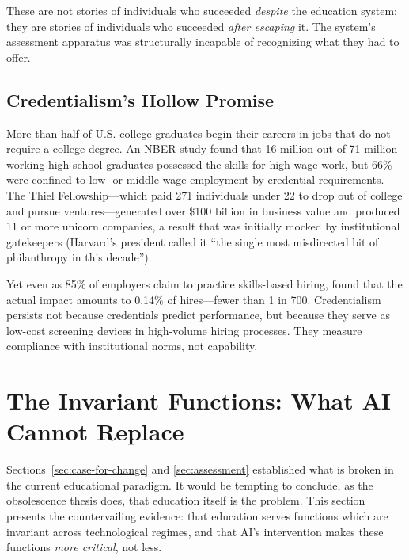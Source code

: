 \documentclass[12pt]{article}
\begin{document}
These are not stories of individuals who succeeded \emph{despite} the education system; they are stories of individuals who succeeded \emph{after escaping} it. The system's assessment apparatus was structurally incapable of recognizing what they had to offer.

\subsection{Credentialism's Hollow Promise}
\label{sec:credentialism}

More than half of U.S. college graduates begin their careers in jobs that do not require a college degree. An NBER study found that 16 million out of 71 million working high school graduates possessed the skills for high-wage work, but 66\% were confined to low- or middle-wage employment by credential requirements. The Thiel Fellowship---which paid 271 individuals under 22 to drop out of college and pursue ventures---generated over \$100 billion in business value and produced 11 or more unicorn companies, a result that was initially mocked by institutional gatekeepers (Harvard's president called it ``the single most misdirected bit of philanthropy in this decade'').

Yet even as 85\% of employers claim to practice skills-based hiring, \citet{HBS2024skills} found that the actual impact amounts to 0.14\% of hires---fewer than 1 in 700. Credentialism persists not because credentials predict performance, but because they serve as low-cost screening devices in high-volume hiring processes. They measure compliance with institutional norms, not capability.

\section{The Invariant Functions: What AI Cannot Replace}
\label{sec:invariant}

Sections~\ref{sec:case-for-change} and \ref{sec:assessment} established what is broken in the current educational paradigm. It would be tempting to conclude, as the obsolescence thesis does, that education itself is the problem. This section presents the countervailing evidence: that education serves functions which are invariant across technological regimes, and that AI's intervention makes these functions \emph{more critical}, not less.
\end{document}
